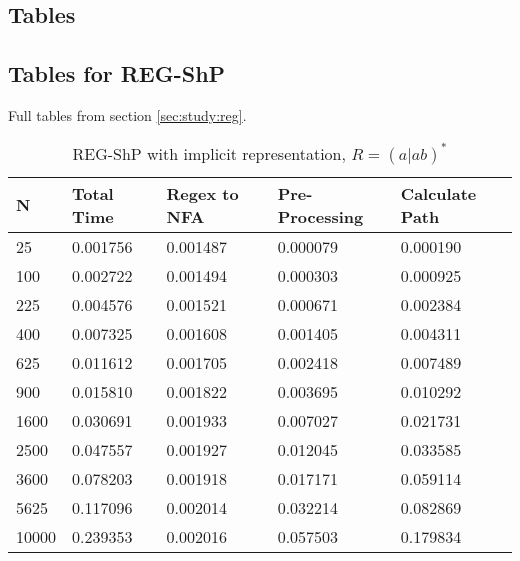 \documentclass[]{article}
\numberwithin{equation}{section}
\begin{document}
\begin{appendices}
\clearpage

\section{Tables}
\label{app:tables}

\subsection{Tables for REG-ShP}
\label{app:tables:reg}

Full tables from section \ref{sec:study:reg}.\\

\begin{table}[H]
	\centering
	\small
	\setlength\tabcolsep{2pt}
	\begin{tabular}{|l|l|l|l|l|}
		\hline
		N     & Total Time & Regex to NFA & Pre-Processing & Calculate Path \\ \hline
		25    & 0.001756   & 0.001487     & 0.000079       & 0.000190       \\ \hline
		100   & 0.002722   & 0.001494     & 0.000303       & 0.000925       \\ \hline
		225   & 0.004576   & 0.001521     & 0.000671       & 0.002384       \\ \hline
		400   & 0.007325   & 0.001608     & 0.001405       & 0.004311       \\ \hline
		625   & 0.011612   & 0.001705     & 0.002418       & 0.007489       \\ \hline
		900   & 0.015810   & 0.001822     & 0.003695       & 0.010292       \\ \hline
		1600  & 0.030691   & 0.001933     & 0.007027       & 0.021731       \\ \hline
		2500  & 0.047557   & 0.001927     & 0.012045       & 0.033585       \\ \hline
		3600  & 0.078203   & 0.001918     & 0.017171       & 0.059114       \\ \hline
		5625  & 0.117096   & 0.002014     & 0.032214       & 0.082869       \\ \hline
		10000 & 0.239353   & 0.002016     & 0.057503       & 0.179834       \\ \hline
	\end{tabular}
	\caption{REG-ShP with implicit representation, $R = (a|ab)^*$}
\end{table}


\end{appendices}
\end{document}
